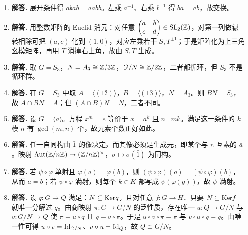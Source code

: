 \begin{enumerate}[label=\textbf{\arabic*.}, leftmargin=*, itemsep=1em]
\item \textbf{解答.} 展开条件得 $abab=aabb$。左乘 $a^{-1}$、右乘 $b^{-1}$ 得 $ba=ab$，故交换。
\item \textbf{解答.} 用整数矩阵的 Euclid 消元：对任意 $\begin{pmatrix} a&b\\c&d \end{pmatrix}\in\mathrm{SL}_2(\mathbb{Z})$，对第一列做辗转相除可把 $(a,c)$ 化到 $(1,0)$，对应左乘若干 $S,T^{\pm1}$；于是矩阵化为上三角幺模矩阵，再用 $T$ 消掉右上角，故由 $S,T$ 生成。
\item \textbf{解答.} 取 $G=S_3$，$N=A_3\cong\mathbb{Z}/3\mathbb{Z}$，$G/N\cong\mathbb{Z}/2\mathbb{Z}$，二者都循环，但 $S_3$ 不是循环群。
\item \textbf{解答.} 在 $G=S_3$ 中取 $A=\langle(12)\rangle$，$B=\langle(13)\rangle$，$N=A_3$。则 $BN=S_3$，故 $A\cap BN=A$；但 $(A\cap B)N=N$，二者不同。
\item \textbf{解答.} 设 $G=\langle a\rangle$。方程 $x^m=e$ 等价于 $x=a^k$ 且 $n\mid mk$。满足这一条件的 $k$ 模 $n$ 有 $\gcd(m,n)$ 个，故元素个数正好如此。
\item \textbf{解答.} 任一自同构由 $\bar1$ 的像决定，而其像必须是生成元，即某个与 $n$ 互素的 $\bar a$。映射 $\mathrm{Aut}(\mathbb{Z}/n\mathbb{Z})\to(\mathbb{Z}/n\mathbb{Z})^\times$，$\sigma\mapsto\sigma(\bar1)$ 为同构。
\item \textbf{解答.} 若 $\psi\circ\varphi$ 单射且 $\varphi(a)=\varphi(b)$，则 $(\psi\circ\varphi)(a)=(\psi\circ\varphi)(b)$，从而 $a=b$；若 $\psi\circ\varphi$ 满射，则每个 $k\in K$ 都写成 $\psi(\varphi(g))$，故 $\psi$ 满射。
\item \textbf{解答.} 设 $q:G\to Q$ 满足：$N\subseteq\mathrm{Ker} q$，且对任意 $f:G\to H$、只要 $N\subseteq\mathrm{Ker} f$ 就唯一分解过 $q$。由商映射 $\pi:G\to G/N$ 的泛性质，存在唯一 $u:Q\to G/N$ 与 $v:G/N\to Q$ 使 $\pi=u\circ q$ 且 $q=v\circ\pi$。于是 $u\circ v\circ\pi=\pi$ 与 $v\circ u\circ q=q$。由唯一性可得 $u\circ v=\mathrm{Id}_{G/N}$、$v\circ u=\mathrm{Id}_Q$，故 $Q\cong G/N$。
\end{enumerate}

